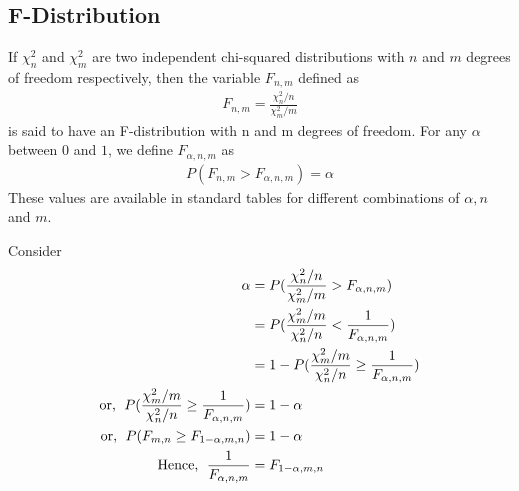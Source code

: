 \documentclass[../probability-notes.tex]{subfiles}
\begin{document}
    \subsection{F-Distribution}
    If $\chi_{n}^{2}$ and $\chi_{m}^{2}$ are two independent chi-squared distributions with $n$ and $m$ degrees of freedom respectively, then the variable $F_{n,m}$ defined as
    \begin{align*}
        F_{n,m} = \frac{\chi_{n}^{2}/n}{\chi_{m}^{2}/m}
    \end{align*}
    is said to have an F-distribution with n and m degrees of freedom.\newline
    For any $\alpha$ between $0$ and $1$, we define $F_{\alpha, n, m}$ as 
    \begin{align*}
        P(F_{n,m} > F_{\alpha, n, m}) = \alpha
    \end{align*}
    These values are available in standard tables for different combinations of $\alpha, n$ and $m$.\newline

    Consider
    \begin{align*}
        \alpha &= P(\frac{\chi_{n}^{2}/n}{\chi_{m}^{2}/m} > F_{\alpha, n, m})\\
        &= P(\frac{\chi_{m}^{2}/m}{\chi_{n}^{2}/n} < \frac{1}{F_{\alpha, n, m}})\\
        &= 1 - P(\frac{\chi_{m}^{2}/m}{\chi_{n}^{2}/n} \geq \frac{1}{F_{\alpha, n, m}})\\
        \text{or, \;} P(\frac{\chi_{m}^{2}/m}{\chi_{n}^{2}/n} \geq \frac{1}{F_{\alpha, n, m}}) &= 1 - \alpha\\
        \text{or, \;} P(F_{m,n} \geq F_{1 - \alpha, m, n}) &= 1 - \alpha\\
        \text{Hence, \;} \frac{1}{F_{\alpha, n, m}} &= F_{1-\alpha, m, n}
    \end{align*}
\end{document}
